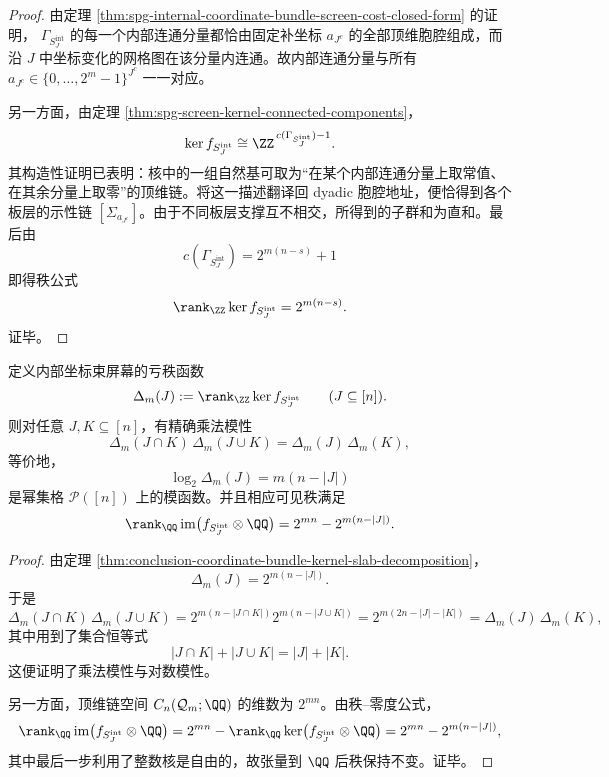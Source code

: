 \begin{proof}
由定理 \ref{thm:spg-internal-coordinate-bundle-screen-cost-closed-form} 的证明，
\(\Gamma_{S_J^{\mathrm{int}}}\) 的每一个内部连通分量都恰由固定补坐标 \(a_{J^c}\) 的全部顶维胞腔组成，而沿 \(J\) 中坐标变化的网格图在该分量内连通。故内部连通分量与所有 \(a_{J^c}\in\{0,\dots,2^m-1\}^{J^c}\) 一一对应。

另一方面，由定理 \ref{thm:spg-screen-kernel-connected-components}，
\[
\ker f_{S_J^{\mathrm{int}}}\cong \ZZ^{\,c(\Gamma_{S_J^{\mathrm{int}}})-1}.
\]
其构造性证明已表明：核中的一组自然基可取为“在某个内部连通分量上取常值、在其余分量上取零”的顶维链。将这一描述翻译回 dyadic 胞腔地址，便恰得到各个板层的示性链 \([\Sigma_{a_{J^c}}]\)。由于不同板层支撑互不相交，所得到的子群和为直和。最后由
\[
c(\Gamma_{S_J^{\mathrm{int}}})=2^{m(n-s)}+1
\]
即得秩公式
\[
\rank_{\ZZ}\ker f_{S_J^{\mathrm{int}}}=2^{m(n-s)}.
\]
证毕。
\end{proof}

\begin{theorem}[坐标束室中的对数模性与显式可见秩]\label{thm:conclusion-coordinate-bundle-logmodularity-visible-rank}
定义内部坐标束屏幕的亏秩函数
\[
\Delta_m(J):=\rank_{\ZZ}\ker f_{S_J^{\mathrm{int}}}
\qquad (J\subseteq [n]).
\]
则对任意 \(J,K\subseteq [n]\)，有精确乘法模性
\[
\Delta_m(J\cap K)\,\Delta_m(J\cup K)=\Delta_m(J)\,\Delta_m(K),
\]
等价地，
\[
\log_2\Delta_m(J)=m(n-|J|)
\]
是幂集格 \(\mathcal P([n])\) 上的模函数。并且相应可见秩满足
\[
\rank_{\QQ}\operatorname{im}\bigl(f_{S_J^{\mathrm{int}}}\otimes \QQ\bigr)
=
2^{mn}-2^{m(n-|J|)}.
\]
\end{theorem}

\begin{proof}
由定理 \ref{thm:conclusion-coordinate-bundle-kernel-slab-decomposition}，
\[
\Delta_m(J)=2^{m(n-|J|)}.
\]
于是
\[
\Delta_m(J\cap K)\,\Delta_m(J\cup K)
=
2^{m(n-|J\cap K|)}2^{m(n-|J\cup K|)}
=
2^{m(2n-|J|-|K|)}
=
\Delta_m(J)\,\Delta_m(K),
\]
其中用到了集合恒等式
\[
|J\cap K|+|J\cup K|=|J|+|K|.
\]
这便证明了乘法模性与对数模性。

另一方面，顶维链空间 \(C_n(\mathcal Q_m;\QQ)\) 的维数为 \(2^{mn}\)。由秩--零度公式，
\[
\rank_{\QQ}\operatorname{im}\bigl(f_{S_J^{\mathrm{int}}}\otimes \QQ\bigr)
=
2^{mn}-\rank_{\QQ}\ker\bigl(f_{S_J^{\mathrm{int}}}\otimes \QQ\bigr)
=
2^{mn}-2^{m(n-|J|)},
\]
其中最后一步利用了整数核是自由的，故张量到 \(\QQ\) 后秩保持不变。证毕。
\end{proof}

